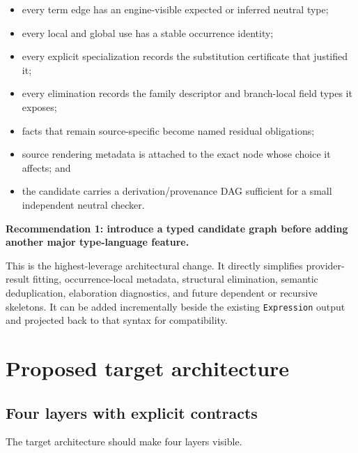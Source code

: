 \documentclass[11pt]{article}
\newcommand{\code}[1]{\texttt{#1}}
\newenvironment{recommendation}[1]
{\par\medskip\noindent\colorbox{GoodBg}{\parbox{\dimexpr\linewidth-2\fboxsep\relax}{\sffamily\bfseries #1}}\par\smallskip}
{\par\medskip}
\begin{document}
\begin{itemize}
  \item every term edge has an engine-visible expected or inferred neutral
    type;
  \item every local and global use has a stable occurrence identity;
  \item every explicit specialization records the substitution certificate
    that justified it;
  \item every elimination records the family descriptor and branch-local field
    types it exposes;
  \item facts that remain source-specific become named residual obligations;
  \item source rendering metadata is attached to the exact node whose choice it
    affects; and
  \item the candidate carries a derivation/provenance DAG sufficient for a
    small independent neutral checker.
\end{itemize}

\begin{recommendation}{Recommendation 1: introduce a typed candidate graph before adding another major type-language feature.}
This is the highest-leverage architectural change.  It directly simplifies
provider-result fitting, occurrence-local metadata, structural elimination,
semantic deduplication, elaboration diagnostics, and future dependent or
recursive skeletons.  It can be added incrementally beside the existing
\code{Expression} output and projected back to that syntax for compatibility.
\end{recommendation}

\section{Proposed target architecture}
\label{sec:architecture}

\subsection{Four layers with explicit contracts}

The target architecture should make four layers visible.
\end{document}
